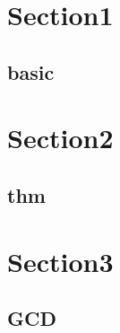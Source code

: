 \section{Section1}
    \subsection{basic}
        

\section{Section2}
    \subsection{thm}
        
        
\section{Section3}
    \subsection{GCD}
    
    
